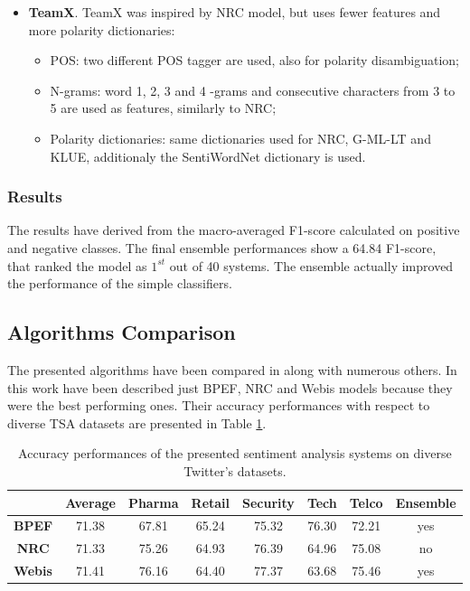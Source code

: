 \begin{itemize}
	
	\item \textbf{TeamX}. TeamX \cite{teamx} was inspired by NRC model, but uses fewer features and more polarity dictionaries:
	\begin{itemize}
		\item \acl{POS}: two different \ac{POS} tagger are used, also for polarity disambiguation;
		\item N-grams: word 1, 2, 3 and 4 -grams and consecutive characters from 3 to 5 are used as features, similarly to NRC;
		\item Polarity dictionaries: same dictionaries used for NRC, G-ML-LT and KLUE, additionaly the SentiWordNet dictionary is used.
	\end{itemize}
\end{itemize}

\subsubsection{Results}

The results have derived from the macro-averaged F1-score calculated on positive and negative classes. The final ensemble performances show a 64.84 F1-score, that ranked the model as $1^{st}$ out of 40 systems. The ensemble actually improved the performance of the simple classifiers.



\subsection{Algorithms Comparison}

The presented algorithms have been compared in \cite{Zimbra:2018:STS:3210372.3185045} along with numerous others. In this work have been described just BPEF, NRC and Webis models because they were the best performing ones. Their accuracy performances with respect to diverse \acl{TSA} datasets are presented in Table \ref{table:perf-presented-alg}.

\begin{table}[H]
	\centering
	\begin{tabular}{ | c || c  c  c  c  c  c | c | }
		\hline
		 & Average & Pharma & Retail & Security & Tech & Telco & Ensemble\\
		\hline
		\textbf{BPEF} & 71.38 & 67.81 & 65.24 & 75.32 & 76.30 & 72.21 & yes\\
		\hline
		\textbf{NRC} & 71.33 & 75.26 & 64.93 & 76.39 & 64.96 & 75.08 & no\\
		\hline
		\textbf{Webis} & 71.41 & 76.16 & 64.40 & 77.37 & 63.68 & 75.46 & yes\\
		\hline
	\end{tabular}
	\caption{Accuracy performances of the presented sentiment analysis systems on diverse Twitter's datasets.}
	\label{table:perf-presented-alg}
\end{table}

